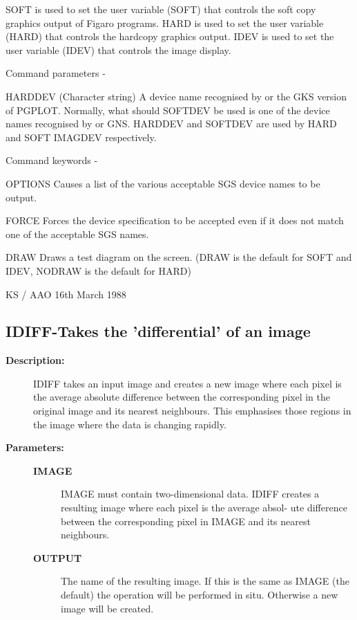 \begin{description}
\begin{description}
\begin{terminalv}
 SOFT is used to set the user variable (SOFT) that controls
 the soft copy graphics output of Figaro programs.  HARD is
 used to set the user variable (HARD) that controls the
 hardcopy graphics output. IDEV is used to set the user variable
 (IDEV) that controls the image display.

 Command parameters -

 HARDDEV  (Character string) A device name recognised by
   or     the GKS version of PGPLOT.  Normally, what should
 SOFTDEV  be used is one of the device names recognised by
   or     GNS.  HARDDEV and SOFTDEV are used by HARD and SOFT
 IMAGDEV  respectively.

 Command keywords -

 OPTIONS  Causes a list of the various acceptable SGS device
          names to be output.

 FORCE    Forces the device specification to be accepted even
          if it does not match one of the acceptable SGS names.

 DRAW     Draws a test diagram on the screen.  (DRAW is the
          default for SOFT and IDEV, NODRAW is the default for HARD)

                                 KS / AAO 16th March 1988
\end{terminalv}
\end{description}
\subsection{IDIFF-\label{IDIFF}Takes the 'differential' of an image}
\begin{description}

\item [\textbf{Description:}]
 IDIFF takes an input image and creates a new image where each pixel
 is the average absolute difference between the corresponding pixel
 in the original image and its nearest neighbours.  This emphasises
 those regions in the image where the data is changing rapidly.

\item [\textbf{Parameters:}]
\begin{description}
\item [\textbf{IMAGE}]
 IMAGE must contain two-dimensional data.  IDIFF creates
 a resulting image where each pixel is the average absol-
 ute difference between the corresponding pixel in IMAGE
 and its nearest neighbours.
\item [\textbf{OUTPUT}]
 The name of the resulting image.  If this is the
 same as IMAGE (the default) the operation will be
 performed in situ.  Otherwise a new image will be
 created.
\end{description}


\end{description}
\end{description}
